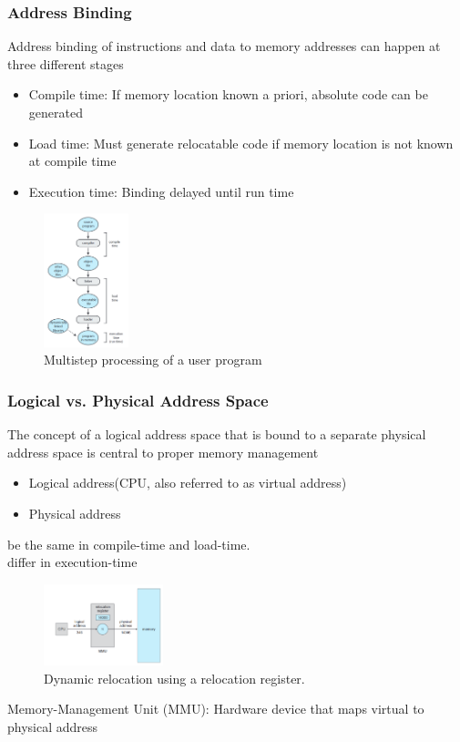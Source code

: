 \subsubsection{Address Binding}
Address binding of instructions and data to memory addresses can happen at three different stages
\begin{itemize}
    \item Compile time: If memory location known a priori, absolute code can be generated
    \item Load time: Must generate relocatable code if memory location is not known at compile time
    \item Execution time: Binding delayed until run time 
\end{itemize}
\begin{figure}[!htb]
    \centering
    \includegraphics[width=0.22\textwidth]{pic/OS8/Multistep processing of a user program}
    \caption{Multistep processing of a user program}
\end{figure}

\subsubsection{Logical vs. Physical Address Space}
The concept of a logical address space that is bound to a separate physical address space is central to proper memory management
\begin{itemize}
    \item Logical address(CPU, also referred to as virtual address)
    \item Physical address
\end{itemize}
be the same in compile-time and load-time.\\
differ in execution-time

\begin{figure}[!htb]
    \centering
    \includegraphics[width=0.309\textwidth]{pic/OS8/Dynamic relocation using a relocation register.}
    \caption{Dynamic relocation using a relocation register.}
\end{figure}
Memory-Management Unit (MMU): Hardware device that maps virtual to physical address

